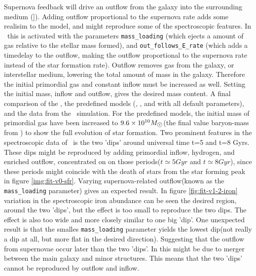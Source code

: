 Supernova feedback will drive an outflow from the galaxy into the surrounding medium (]). Adding outflow proportional to the supernova rate adds some realisim to the model, and might reproduce some of the spectroscopic features.
In \omegamodel\ this is activated with the parameters \verb|mass_loading| (which ejects a amount of gas relative to the stellar mass formed), and \verb|out_follows_E_rate| (which adds a timedelay to the outflow, making the outflow proportional to the supernova rate instead of the star formation rate).
Outflow removes gas from the galaxy, or interstellar medium, lowering the total amount of mass in the galaxy. Therefore the initial primordial gas and constant inflow must be increased as well.
Setting the initial mass, inflow and outflow, gives the desired mass content.
A final comparison of the \fiduccialomega, the predefined models (\mwomega, \mwcomega, and \omegamodel with all default parameters), and the data from the \eris\ simulation.
For the predefined models, the initial mass of primordial gas have been increased to $9.6\times10^{10}\msol$(the final value baryon-mass from \eris) to show the full evolution of star formation.
Two prominent features in the spectroscopic data of \eris\ is the two 'dips' around universal time t=5 and t=8 Gyrs. These dips might be reproduced by adding primordial inflow, hydrogen, and enriched outflow, concentrated on on those periods($t\simeq5Gyr$ and $t\simeq8Gyr$), since these periods might coincide with the death of stars from the star forming peak in figure \ref{img:fit-v0-sfr}.
Varying supernova-related outflow(known as the \texttt{mass\_loading} parameter) gives an expected result. In figure \ref{fig:fit-v1-2-iron} variation in the spectroscopic iron abundance can be seen the desired region, around the two 'dips', but the effect is too small to reproduce the two dips. The effect is also too wide and more closely similar to one big 'dip'. One unexpected result is that the smalles \texttt{mass\_loading} parameter yields the lowest dip(not really a dip at all, but more flat in the desired direction).
Suggesting that the outflow from supernovae occur later than the two 'dips'. In \eris this might be due to merger between the main galaxy and minor structures.
This means that the two 'dips' cannot be reproduced by outflow and inflow.



